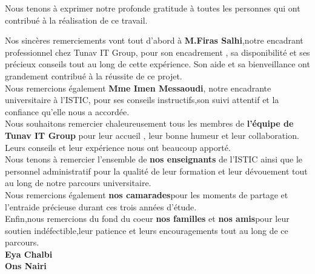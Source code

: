 \documentclass[12pt,a4paper]{report}
\begin{document}
\begin{center}
\large
Nous tenons à exprimer notre profonde gratitude à toutes les personnes qui ont contribué à la réalisation de ce travail.\\ [1.5cm]
\end{center}
\noindent Nos sincères remerciements vont tout d'abord à \textbf{M.Firas Salhi},notre encadrant professionnel chez Tunav IT Group, pour son encadrement , sa disponibilité et ses précieux conseils tout au long de cette expérience. Son aide et sa bienveillance ont grandement contribué à la réussite de ce projet. \\[0.5cm]  
\noindent Nous remercions également \textbf{Mme Imen Messaoudi}, notre encadrante universitaire à l'ISTIC, pour ses conseils instructifs,son suivi attentif et la confiance qu'elle nous a accordée. \\[0.5cm]
\noindent Nous souhaitons  remercier chaleureusement tous les membres de  \textbf{l'équipe de Tunav IT Group} pour leur accueil , leur bonne humeur et leur collaboration. Leurs conseils et leur expérience nous ont beaucoup apporté.\\[0.5cm]
\noindent Nous tenons à remercier  l'ensemble de \textbf{nos enseignants} de l'ISTIC ainsi que le personnel administratif  pour la qualité de leur formation et leur dévouement tout au long de notre parcours universitaire.\\[0.5cm]
\noindent Nous remercions également \textbf{nos camarades}pour les moments de partage et l'entraide précieuse durant ces trois années d'étude.\\[0.5cm]
\noindent Enfin,nous remercions du fond du coeur \textbf{nos familles} et \textbf{nos amis}pour leur soutien indéfectible,leur patience et leurs encouragements tout au long de ce parcours.\\[1cm]

\hfill\textbf{Eya  Chalbi}\\[1cm] 
\vspace{2cm}
\hfill\textbf{ Ons Nairi}


\tableofcontents

\listoffigures

\listoftables
\end{document}
